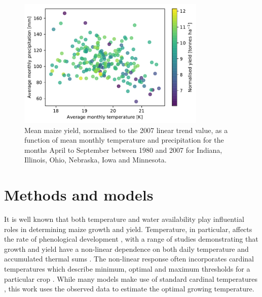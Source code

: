 \documentclass[12pt]{article}
\begin{document}
\begin{figure}
\centering
\includegraphics[width=0.8\textwidth]{./figures/mean_real_data_scatter}
\caption{\label{fig:real_yield_responses} Mean maize yield, normalised to the 2007 linear trend value, as a function of mean monthly temperature and precipitation for the months April to September between 1980 and 2007 for Indiana, Illinois, Ohio, Nebraska, Iowa and Minnesota.}
\end{figure}

\section{Methods and models}
\label{sec:models}

It is well known that both temperature and water availability play influential roles in determining maize growth and yield. Temperature, in particular, affects the rate of phenological development \citep[e.g.][]{cross:1972, coelho:1980, daughtry:1984, cutforth:1990, bonhomme:1994}, with a range of studies demonstrating that growth and yield have a non-linear dependence on both daily temperature and accumulated thermal sums \citep[e.g.][]{cutforth:1990, streck:2007, schlenker:2009, lobell:2013, zhou:2018}. The non-linear response often incorporates cardinal temperatures which describe minimum, optimal and maximum thresholds for a particular crop \citep[e.g.][]{yin:1995, wang:1998, zhou:2018}. While many models make use of standard cardinal temperatures \citep[e.g.][]{yin:1995}, this work uses the observed data to estimate the optimal growing temperature.
\end{document}
